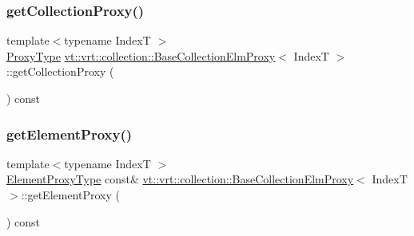 \subsubsection{\texorpdfstring{get\+Collection\+Proxy()}{getCollectionProxy()}}
{\footnotesize\ttfamily template$<$typename IndexT $>$ \\
\hyperlink{structvt_1_1vrt_1_1collection_1_1_base_collection_elm_proxy_a1a60a46fe46552edfaf5c8785e283615}{Proxy\+Type} \hyperlink{structvt_1_1vrt_1_1collection_1_1_base_collection_elm_proxy}{vt\+::vrt\+::collection\+::\+Base\+Collection\+Elm\+Proxy}$<$ IndexT $>$\+::get\+Collection\+Proxy (\begin{DoxyParamCaption}{ }\end{DoxyParamCaption}) const\hspace{0.3cm}{\ttfamily [inline]}}

\mbox{\label{structvt_1_1vrt_1_1collection_1_1_base_collection_elm_proxy_ab0399248efc4076a2010e2839ecd601f}} 
\subsubsection{\texorpdfstring{get\+Element\+Proxy()}{getElementProxy()}}
{\footnotesize\ttfamily template$<$typename IndexT $>$ \\
\hyperlink{structvt_1_1vrt_1_1collection_1_1_base_collection_elm_proxy_aeb2058caef8c935a8a88654787672305}{Element\+Proxy\+Type} const\& \hyperlink{structvt_1_1vrt_1_1collection_1_1_base_collection_elm_proxy}{vt\+::vrt\+::collection\+::\+Base\+Collection\+Elm\+Proxy}$<$ IndexT $>$\+::get\+Element\+Proxy (\begin{DoxyParamCaption}{ }\end{DoxyParamCaption}) const\hspace{0.3cm}{\ttfamily [inline]}}

\mbox{\label{structvt_1_1vrt_1_1collection_1_1_base_collection_elm_proxy_a0434fa3700f8059d745454dcd6cb7f4c}} 

